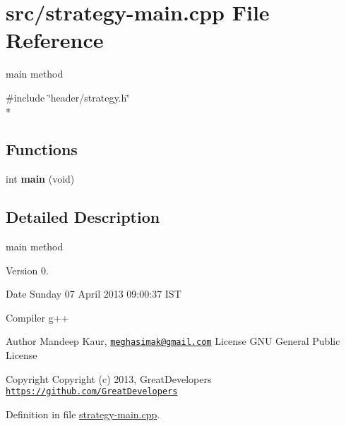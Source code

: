 \hypertarget{strategy-main_8cpp}{\section{src/strategy-\/main.cpp File Reference}
\label{strategy-main_8cpp}
}


main method  


{\ttfamily \#include \char`\"{}header/strategy.\-h\char`\"{}}\\*
\subsection*{Functions}
\begin{DoxyCompactItemize}
\item 
\hypertarget{strategy-main_8cpp_a840291bc02cba5474a4cb46a9b9566fe}{int {\bfseries main} (void)}\label{strategy-main_8cpp_a840291bc02cba5474a4cb46a9b9566fe}

\end{DoxyCompactItemize}


\subsection{Detailed Description}
main method \begin{DoxyVersion}{Version}
0. 
\end{DoxyVersion}
\begin{DoxyDate}{Date}
Sunday 07 April 2013 09\-:00\-:37 I\-S\-T\par
 Compiler g++
\end{DoxyDate}
\begin{DoxyAuthor}{Author}
Mandeep Kaur, \href{mailto:meghasimak@gmail.com}{\tt meghasimak@gmail.\-com} License G\-N\-U General Public License 
\end{DoxyAuthor}
\begin{DoxyCopyright}{Copyright}
Copyright (c) 2013, Great\-Developers \href{https://github.com/GreatDevelopers}{\tt https\-://github.\-com/\-Great\-Developers} 
\end{DoxyCopyright}


Definition in file \hyperlink{strategy-main_8cpp_source}{strategy-\/main.\-cpp}.

